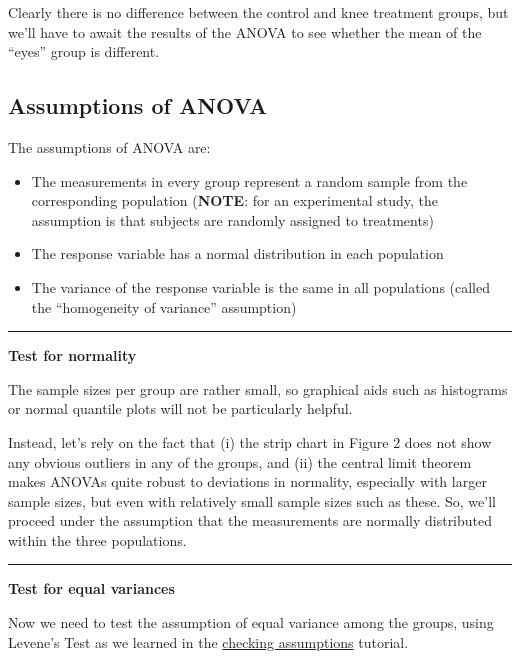 \documentclass[
]{book}
\providecommand{\tightlist}{%
  \setlength{\itemsep}{0pt}\setlength{\parskip}{0pt}}
\begin{document}
Clearly there is no difference between the control and knee treatment groups, but we'll have to await the results of the ANOVA to see whether the mean of the ``eyes'' group is different.

\subsection{Assumptions of ANOVA}\label{assump_anova}

The assumptions of ANOVA are:

\begin{itemize}
\tightlist
\item
  The measurements in every group represent a random sample from the corresponding population (\textbf{NOTE}: for an experimental study, the assumption is that subjects are randomly assigned to treatments)\\
\item
  The response variable has a normal distribution in each population
\item
  The variance of the response variable is the same in all populations (called the ``homogeneity of variance'' assumption)
\end{itemize}

\begin{center}\rule{0.5\linewidth}{0.5pt}\end{center}

\textbf{Test for normality}

The sample sizes per group are rather small, so graphical aids such as histograms or normal quantile plots will not be particularly helpful.

Instead, let's rely on the fact that (i) the strip chart in Figure 2 does not show any obvious outliers in any of the groups, and (ii) the central limit theorem makes ANOVAs quite robust to deviations in normality, especially with larger sample sizes, but even with relatively small sample sizes such as these. So, we'll proceed under the assumption that the measurements are normally distributed within the three populations.

\begin{center}\rule{0.5\linewidth}{0.5pt}\end{center}

\textbf{Test for equal variances}

Now we need to test the assumption of equal variance among the groups, using Levene's Test as we learned in the \href{https://ubco-biology.github.io/BIOL202/checking-assumptions-and-data-transformations.html}{checking assumptions} tutorial.
\end{document}
